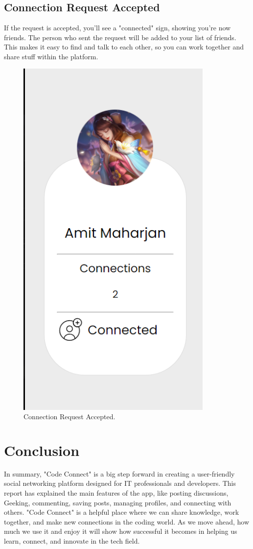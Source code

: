 \subsection{Connection Request Accepted}
If the request is accepted, you'll see a "connected" sign, showing you're now friends. The person who sent the request will be added to your list of friends. This makes it easy to find and talk to each other, so you can work together and share stuff within the platform.
\begin{figure}[ht]
    \centering
    \includegraphics[height=0.3\textheight]{Outcome-ss/result-after-accepting.png}
    \caption{Connection Request Accepted.}
    \label{fig:Connection Request Accepted}
\end{figure}

\section{Conclusion}
In summary, "Code Connect" is a big step forward in creating a user-friendly social networking platform designed for IT professionals and developers. This report has explained the main features of the app, like posting discussions, Geeking, commenting, saving posts, managing profiles, and connecting with others. "Code Connect" is a helpful place where we can share knowledge, work together, and make new connections in the coding world. As we move ahead, how much we use it and enjoy it will show how successful it becomes in helping us learn, connect, and innovate in the tech field.

